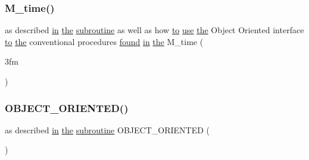 \mbox{\label{M__time_83_8txt_a9591ef7ca68b7656bfd5560ed8d81293}} 
\subsubsection{\texorpdfstring{M\+\_\+time()}{M\_time()}\hspace{0.1cm}{\footnotesize\ttfamily [2/2]}}
{\footnotesize\ttfamily as described \hyperlink{M__journal_83_8txt_afce72651d1eed785a2132bee863b2f38}{in} \hyperlink{M__stopwatch_83_8txt_a0f266597de2e57eb3aa964927bb30e14}{the} \hyperlink{M__stopwatch_83_8txt_acfbcff50169d691ff02d4a123ed70482}{subroutine} as well as how \hyperlink{M__stopwatch_83_8txt_a97209fd3e34ef701c0a9734280779cbb}{to} \hyperlink{intro__blas1_83_8txt_a04fa2694d85f67a675bb3f45f7241f48}{use} \hyperlink{M__stopwatch_83_8txt_a0f266597de2e57eb3aa964927bb30e14}{the} Object Oriented interface \hyperlink{M__stopwatch_83_8txt_a97209fd3e34ef701c0a9734280779cbb}{to} \hyperlink{M__stopwatch_83_8txt_a0f266597de2e57eb3aa964927bb30e14}{the} conventional procedures \hyperlink{what__overview_81_8txt_ac0a3098bb3d5de70ed1c81da8bfd2599}{found} \hyperlink{M__journal_83_8txt_afce72651d1eed785a2132bee863b2f38}{in} \hyperlink{M__stopwatch_83_8txt_a0f266597de2e57eb3aa964927bb30e14}{the} M\+\_\+time (\begin{DoxyParamCaption}\item[{3fm}]{ }\end{DoxyParamCaption})}

\mbox{\label{M__time_83_8txt_a82d408d5c398e54b1461070b826ef70e}} 
\subsubsection{\texorpdfstring{O\+B\+J\+E\+C\+T\+\_\+\+O\+R\+I\+E\+N\+T\+E\+D()}{OBJECT\_ORIENTED()}}
{\footnotesize\ttfamily as described \hyperlink{M__journal_83_8txt_afce72651d1eed785a2132bee863b2f38}{in} \hyperlink{M__stopwatch_83_8txt_a0f266597de2e57eb3aa964927bb30e14}{the} \hyperlink{M__stopwatch_83_8txt_acfbcff50169d691ff02d4a123ed70482}{subroutine} O\+B\+J\+E\+C\+T\+\_\+\+O\+R\+I\+E\+N\+T\+ED (\begin{DoxyParamCaption}{ }\end{DoxyParamCaption})}



